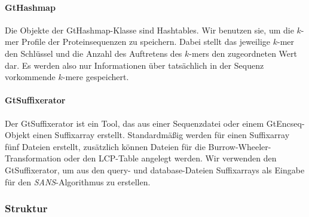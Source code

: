 \documentclass{article}
\begin{document}
\paragraph{GtHashmap}
Die Objekte der GtHashmap-Klasse sind Hashtables. Wir benutzen sie, um die $k$-mer
Profile der Proteinsequenzen zu speichern. Dabei stellt das jeweilige $k$-mer den
Schlüssel und die Anzahl des Auftretens des $k$-mers den zugeordneten Wert dar. Es
werden also nur Informationen über tatsächlich in der Sequenz vorkommende $k$-mere
gespeichert.

\paragraph{GtSuffixerator}
Der GtSuffixerator ist ein Tool, das aus einer Sequenzdatei oder einem GtEncseq-Objekt einen Suffixarray erstellt. Standardmäßig werden für einen Suffixarray fünf Dateien erstellt, zusätzlich können Dateien für die Burrow-Wheeler-Transformation oder den LCP-Table angelegt werden. Wir verwenden den GtSuffixerator, um aus den query- und database-Dateien Suffixarrays als Eingabe für den \emph{SANS}-Algorithmus zu erstellen.

\subsubsection{Struktur}
\end{document}
